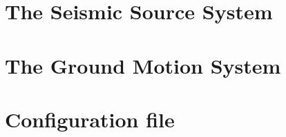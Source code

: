 \section{The Seismic Source System}

\label{sec:seismic_source_system}

\section{The Ground Motion System}
\label{sec:ground_motion_system}


\section{Configuration file}
\label{sec:hazard_configuration_file}
